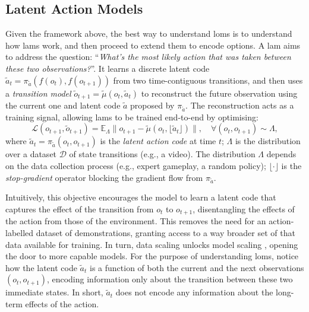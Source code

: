 \documentclass{article}
\theoremstyle{postulate}
\begin{document}
\subsection{Latent Action Models}
Given the framework above, the best way to understand \glspl{lom} is to understand how \glspl{lam} work, and then proceed to extend them to encode options.
A \gls{lam} aims to address the question: ``\textit{What's the most likely action that was taken between these two observations?}''.
It learns a discrete latent code $\tilde{a}_t = \pi_{\tilde{a}}(f(o_t), f(o_{t+1}))$ from two time-contiguous transitions, and then uses a \textit{transition model} $\tilde{o}_{t+1} = \tilde{\mu}(o_t, \tilde{a}_t)$ to reconstruct the future observation using the current one and latent code $\tilde{a}$ proposed by $\pi_{\tilde{a}}$. 
The reconstruction acts as a training signal, allowing \glspl{lam} to be trained end-to-end by optimising:
\begin{equation}
    \label{eq:lam-objective}
    \mathcal{L}(o_{t+1}, \tilde{o}_{t+1}) = \mathbb{E}_{\Lambda} \| o_{t+1} - \tilde{\mu}(o_t, \lfloor\tilde{a}_t\rfloor) \|, \quad \forall (o_t, o_{t+1}) \sim \Lambda, %
\end{equation}
where $\tilde{a}_t = \pi_{\tilde{a}}(o_t, o_{t+1})$ is the \textit{latent action code} at time $t$; $\Lambda$ is the distribution over a dataset $\mathcal{D}$ of state transitions (e.g., a video).
The distribution $\Lambda$ depends on the data collection process (e.g., expert gameplay, a random policy); $\lfloor \cdot \rfloor$ is the \textit{stop-gradient} operator blocking the gradient flow from $\pi_{\tilde{a}}$.

Intuitively, this objective encourages the model to learn a latent code that captures the effect of the transition from $o_t$ to $o_{t+1}$, disentangling the effects of the action from those of the environment.
This removes the need for an action-labelled dataset of demonstrations, granting access to a way broader set of that data available for training.
In turn, data scaling unlocks model scaling \citep{kaplan2020scaling}, opening the door to more capable models.
For the purpose of understanding \glspl{lom}, notice how the latent code $\tilde{a}_t$ is a function of both the current and the next observations $(o_t, o_{t+1})$, encoding information only about the transition between these two immediate states.
In short, $\tilde{a}_t$ does not encode any information about the long-term effects of the action.
\end{document}
